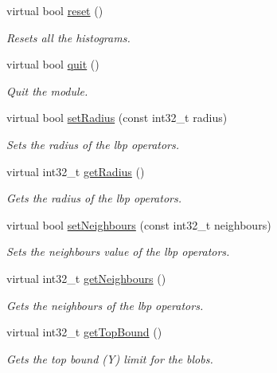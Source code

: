 \begin{DoxyCompactItemize}
\item 
virtual bool \mbox{\hyperlink{classlbpExtract__IDLServer_a9d9b1223c68851e94b0c8c0bd8d3cedc}{reset}} ()
\begin{DoxyCompactList}\small\item\em Resets all the histograms. \end{DoxyCompactList}\item 
virtual bool \mbox{\hyperlink{classlbpExtract__IDLServer_a4086feb2a3cee548670673235277b6f0}{quit}} ()
\begin{DoxyCompactList}\small\item\em Quit the module. \end{DoxyCompactList}\item 
virtual bool \mbox{\hyperlink{classlbpExtract__IDLServer_a2391f554973a3b7d32d6eea6bbb233d7}{set\+Radius}} (const int32\+\_\+t radius)
\begin{DoxyCompactList}\small\item\em Sets the radius of the lbp operators. \end{DoxyCompactList}\item 
virtual int32\+\_\+t \mbox{\hyperlink{classlbpExtract__IDLServer_a8c9a3adfcb9e7d37c4388bc3950da23b}{get\+Radius}} ()
\begin{DoxyCompactList}\small\item\em Gets the radius of the lbp operators. \end{DoxyCompactList}\item 
virtual bool \mbox{\hyperlink{classlbpExtract__IDLServer_aa72b58e41cf97d26825515cc9d5e6aa6}{set\+Neighbours}} (const int32\+\_\+t neighbours)
\begin{DoxyCompactList}\small\item\em Sets the neighbours value of the lbp operators. \end{DoxyCompactList}\item 
virtual int32\+\_\+t \mbox{\hyperlink{classlbpExtract__IDLServer_abf7693b9f3f63c2a16e163a3991b7d01}{get\+Neighbours}} ()
\begin{DoxyCompactList}\small\item\em Gets the neighbours of the lbp operators. \end{DoxyCompactList}\item 
virtual int32\+\_\+t \mbox{\hyperlink{classlbpExtract__IDLServer_a693ea8bf9638a27fdf3f7d40f7ad8f51}{get\+Top\+Bound}} ()
\begin{DoxyCompactList}\small\item\em Gets the top bound (Y) limit for the blobs. \end{DoxyCompactList}\item 

\end{DoxyCompactItemize}

